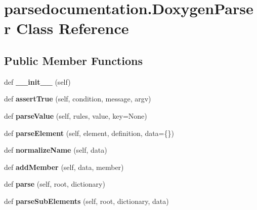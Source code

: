 \hypertarget{classparsedocumentation_1_1DoxygenParser}{}\section{parsedocumentation.\+Doxygen\+Parser Class Reference}
\label{classparsedocumentation_1_1DoxygenParser}
\subsection*{Public Member Functions}
\begin{DoxyCompactItemize}
\item 
\mbox{\label{classparsedocumentation_1_1DoxygenParser_aa358d8278c14fb9776a2d7369214b9c6}} 
def {\bfseries \+\_\+\+\_\+init\+\_\+\+\_\+} (self)
\item 
\mbox{\label{classparsedocumentation_1_1DoxygenParser_aa4ade0c665734267b4aaf5333193432f}} 
def {\bfseries assert\+True} (self, condition, message, argv)
\item 
\mbox{\label{classparsedocumentation_1_1DoxygenParser_a5ccbd61554f7780e02703b4d776e07b3}} 
def {\bfseries parse\+Value} (self, rules, value, key=None)
\item 
\mbox{\label{classparsedocumentation_1_1DoxygenParser_ae151a99cc3eeb0ba1e869fdbe3154d16}} 
def {\bfseries parse\+Element} (self, element, definition, data=\{\})
\item 
\mbox{\label{classparsedocumentation_1_1DoxygenParser_ad4b62eb487d05a3f10f361620c063e27}} 
def {\bfseries normalize\+Name} (self, data)
\item 
\mbox{\label{classparsedocumentation_1_1DoxygenParser_a9be52c68e0e4f9a93f59f60b4cc075be}} 
def {\bfseries add\+Member} (self, data, member)
\item 
\mbox{\label{classparsedocumentation_1_1DoxygenParser_ad272c1b47d8d18bbc7193d361737ee48}} 
def {\bfseries parse} (self, root, dictionary)
\item 
\mbox{\label{classparsedocumentation_1_1DoxygenParser_ac96aa91f2652eb3eb1f5a54a6942c4dd}} 
def {\bfseries parse\+Sub\+Elements} (self, root, dictionary, data)
\end{DoxyCompactItemize}
